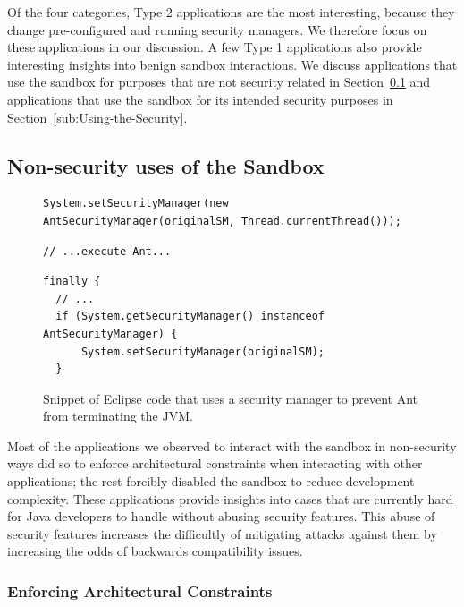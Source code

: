 \documentclass{sig-alternate}
\begin{document}
Of the four categories, Type 2 applications are the most interesting, because
they change pre-configured and running security managers.  We therefore focus
on these applications in our discussion. A few Type 1
applications also provide interesting insights into
benign sandbox interactions. We discuss applications that use the sandbox for
purposes that are not security related in Section~\ref{sub:Non-security-uses-of}
and applications that use the sandbox for its intended security purposes in
Section~\ref{sub:Using-the-Security}.

\subsection{Non-security uses of the Sandbox}\label{sub:Non-security-uses-of}

\begin{figure}
\begin{lstlisting}[firstnumber=691]
System.setSecurityManager(new AntSecurityManager(originalSM, Thread.currentThread()));
\end{lstlisting}
\vspace{-0.3cm}
\begin{lstlisting}[firstnumber=703]
// ...execute Ant...
\end{lstlisting}
\vspace{-0.3cm}
\begin{lstlisting}[firstnumber=723]
finally {
  // ...
  if (System.getSecurityManager() instanceof AntSecurityManager) { 
      System.setSecurityManager(originalSM); 
  }
\end{lstlisting}\vspace{-0.3cm}
\caption{Snippet of Eclipse code that uses a security manager to prevent Ant\label{fig:Eclipse-snippet}
from terminating the JVM.}
\end{figure}

Most of the applications we observed to interact with the sandbox in
non-security ways did so to enforce architectural constraints when interacting with
other applications; the rest forcibly disabled the sandbox to reduce development
complexity. These applications provide insights into cases that are currently hard for Java developers to handle without abusing security features. This abuse of security features increases the difficultly of mitigating attacks against them by increasing the odds of backwards compatibility issues.

\subsubsection{Enforcing Architectural Constraints}
\end{document}
